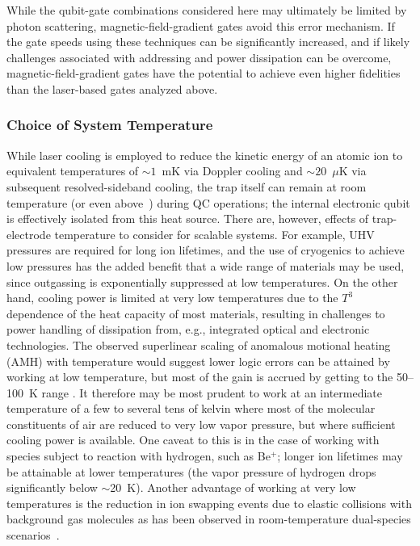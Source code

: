 \documentclass[%
reprint,
 amsmath,amssymb,
]{revtex4-1}
\begin{document}
While the qubit-gate combinations considered here may ultimately be limited by photon scattering, magnetic-field-gradient gates avoid this error mechanism.  If the gate speeds using these techniques can be significantly increased, and if likely challenges associated with addressing and power dissipation can be overcome, magnetic-field-gradient gates have the potential to achieve even higher fidelities than the laser-based gates analyzed above.

\subsubsection{Choice of System Temperature}

While laser cooling is employed to reduce the kinetic energy of an atomic ion to equivalent temperatures of ${\sim}1$~mK via Doppler cooling and ${\sim}20$~$\mu$K via subsequent resolved-sideband cooling, the trap itself can remain at room temperature (or even above~\cite{UCB_heater_heating_rates_2018}) during QC operations; the internal electronic qubit is effectively isolated from this heat source.  There are, however, effects of trap-electrode temperature to consider for scalable systems.  For example, UHV pressures are required for long ion lifetimes, and the use of cryogenics to achieve low pressures has the added benefit that a wide range of materials may be used, since outgassing is exponentially suppressed at low temperatures.  On the other hand, cooling power is limited at very low temperatures due to the $T^{3}$ dependence of the heat capacity of most materials, resulting in challenges to power handling of dissipation from, e.g., integrated optical and electronic technologies.  The observed superlinear scaling of anomalous motional heating (AMH) with temperature would suggest lower logic errors can be attained by working at low temperature, but most of the gain is accrued by getting to the 50--100~K range \cite{PhysRevA.89.012318_2014}.  It therefore may be most prudent to work at an intermediate temperature of a few to several tens of kelvin where most of the molecular constituents of air are reduced to very low vapor pressure, but where sufficient cooling power is available.  One caveat to this is in the case of working with species subject to reaction with hydrogen, such as Be$^{+}$; longer ion lifetimes may be attainable at lower temperatures (the vapor pressure of hydrogen drops significantly below ${\sim}$20~K).  Another advantage of working at very low temperatures is the reduction in ion swapping events due to elastic collisions with background gas molecules as has been observed in room-temperature dual-species scenarios~\cite{BallanceHybridLogic2015}.
\end{document}
